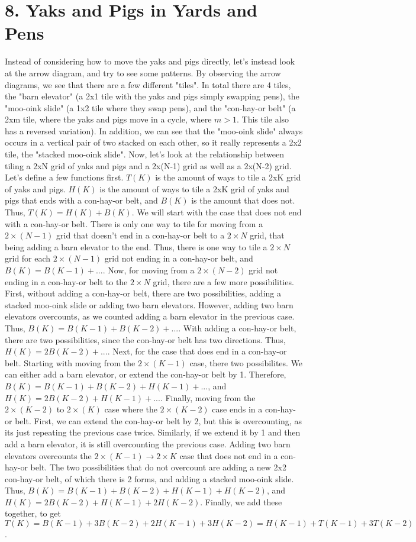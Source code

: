 \documentclass{article}
\begin{document}
\section*{8. Yaks and Pigs in Yards and Pens}
Instead of considering how to move the yaks and pigs directly, let's instead look at the arrow diagram, and try to see some patterns. By observing the arrow diagrams, we see that there are a few different "tiles". In total there are 4 tiles, the "barn elevator" (a 2x1 tile with the yaks and pigs simply swapping pens), the "moo-oink slide" (a 1x2 tile where they swap pens), and the "con-hay-or belt" (a 2xm tile, where the yaks and pigs move in a cycle, where $m>1$. This tile also has a reversed variation). In addition, we can see that the "moo-oink slide" always occurs in a vertical pair of two stacked on each other, so it really represents a 2x2 tile, the "stacked moo-oink slide". Now, let's look at the relationship between tiling a 2xN grid of yaks and pigs and a 2x(N-1) grid as well as a 2x(N-2) grid. Let's define a few functions first. $T(K)$ is the amount of ways to tile a 2xK grid of yaks and pigs. $H(K)$ is the amount of ways to tile a 2xK grid of yaks and pigs that ends with a con-hay-or belt, and $B(K)$ is the amount that does not. Thus, $T(K)=H(K)+B(K)$. We will start with the case that does not end with a con-hay-or belt. There is only one way to tile for moving from a $2\times (N-1)$ grid that doesn't end in a con-hay-or belt to a $2\times N$ grid, that being adding a barn elevator to the end. Thus, there is one way to tile a $2\times N$ grid for each $2\times (N-1)$ grid not ending in a con-hay-or belt, and $B(K)=B(K-1)+...$. Now, for moving from a $2\times (N-2)$ grid not ending in a con-hay-or belt to the $2 \times N$ grid, there are a few more possibilities. First, without adding a con-hay-or belt, there are two possibilities, adding a stacked moo-oink slide or adding two barn elevators. However, adding two barn elevators overcounts, as we counted adding a barn elevator in the previous case. Thus, $B(K)=B(K-1)+B(K-2)+...$. With adding a con-hay-or belt, there are two possibilities, since the con-hay-or belt has two directions. Thus, $H(K)=2B(K-2)+...$. Next, for the case that does end in a con-hay-or belt. Starting with moving from the $2\times (K-1)$ case, there two possibilites. We can either add a barn elevator, or extend the con-hay-or belt by 1. Therefore, $B(K)=B(K-1)+B(K-2)+H(K-1)+...$, and $H(K)=2B(K-2)+H(K-1)+...$. Finally, moving from the $2\times (K-2)$ to $2\times (K)$ case where the $2\times (K-2)$ case ends in a con-hay-or belt. First, we can extend the con-hay-or belt by 2, but this is overcounting, as its just repeating the previous case twice. Similarly, if we extend it by 1 and then add a barn elevator, it is still overcounting the previous case. Adding two barn elevators overcounts the $2\times (K-1) \to 2\times K$ case that does not end in a con-hay-or belt. The two possibilities that do not overcount are adding a new 2x2 con-hay-or belt, of which there is 2 forms, and adding a stacked moo-oink slide. Thus, $B(K)=B(K-1)+B(K-2)+H(K-1)+H(K-2)$, and $H(K)=2B(K-2)+H(K-1)+2H(K-2)$. Finally, we add these together, to get $T(K)=B(K-1)+3B(K-2)+2H(K-1)+3H(K-2)=H(K-1)+T(K-1)+3T(K-2)$.
\end{document}
